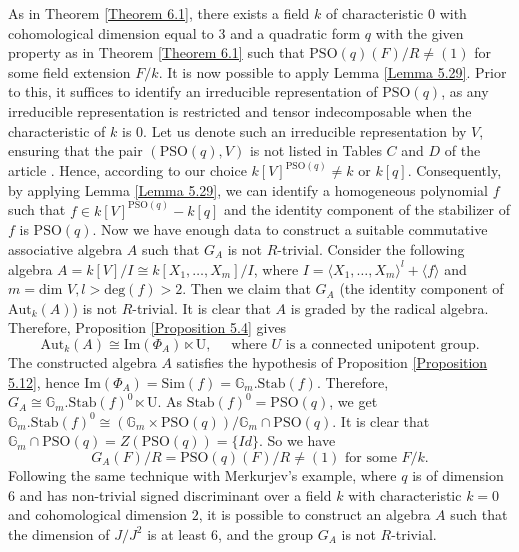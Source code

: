 \documentclass[12pt]{amsart}
\theoremstyle{definition}
\numberwithin{equation}{section}
\begin{document}
\vskip2mm
\noindent
As in Theorem \ref{Theorem 6.1}, there exists a field $k$ of characteristic $0$ with cohomological dimension equal to $3$ and a quadratic form $q$ with the given property as in Theorem \ref{Theorem 6.1} such that $\text{PSO}(q)(F)/R\neq (1)$ for some field extension $F/k$. It is now possible to apply Lemma \ref{Lemma 5.29}. Prior to this, it suffices to identify an irreducible representation of $\text{PSO}(q)$, as any irreducible representation is restricted and tensor indecomposable when the characteristic of $k$ is $0$. Let us denote such an irreducible representation by $V$, ensuring that the pair $(\text{PSO}(q), V)$ is not listed in Tables $C$ and $D$ of the article \cite{GG}. Hence, according to our choice $k[V]^{\text{PSO}(q)}\neq k$ or $k[q]$. Consequently, by applying Lemma \ref{Lemma 5.29}, we can identify a homogeneous polynomial \( f \) such that \( f \in k[V]^{\text{PSO}(q)} - k[q] \) and the identity component of the stabilizer of \( f \) is \( \text{PSO}(q) \). Now we have enough data to construct a suitable commutative associative algebra $A$ such that $G_A$  is not $R$-trivial. Consider the following algebra $A=k[V]/I\cong k[X_1,\dots,X_m]/I$, where $I=\langle X_1,\dots,X_m\rangle^l+\langle f\rangle$ and $m=\text{dim }V, l>\text{deg}(f)>2$.
\vskip2mm 
\noindent
Then we claim that $G_A$ (the identity component of $\text{Aut}_k(A)$) is not $R$-trivial.  It is clear that $A$ is graded by the radical algebra. Therefore, Proposition \ref{Proposition 5.4} gives  
\[\text{Aut}_k(A)\cong \text{Im}(\Phi_A) \ltimes \text{U}, \quad \text{ where } U\text{ is a connected unipotent group.}\]
The constructed algebra $A$ satisfies the hypothesis of Proposition \ref{Proposition 5.12}, hence $\text{Im}(\Phi_A)=\text{Sim}(f)=\mathbb{G}_m.\text{Stab}(f)$. Therefore,
$G_A\cong \mathbb{G}_m.\text{Stab}(f)^{0}\ltimes \text{U}.$
As $\text{Stab}(f)^0=\text{PSO}(q)$, we get $\mathbb{G}_m.\text{Stab}(f)^{0}\cong(\mathbb{G}_m\times \text{PSO}(q))/\mathbb{G}_m\cap \text{PSO}(q)$. It is clear that $\mathbb{G}_m\cap \text{PSO}(q)=Z(\text{PSO}(q))=\{Id\}$. So we have 
\begin{equation*}
G_A(F)/R=\text{PSO}(q)(F)/R\neq (1) \text{ for some } F/k.
\end{equation*}
\vskip2mm
\noindent
 Following the same technique with Merkurjev's example, where $q$ is of dimension $6$ and has non-trivial signed discriminant over a field $k$ with characteristic $k=0$ and cohomological dimension $2$, it is possible to construct an algebra $A$ such that the dimension of $J/J^2$ is at least $6$, and the group $G_A$ is not $R$-trivial.   
\end{document}
